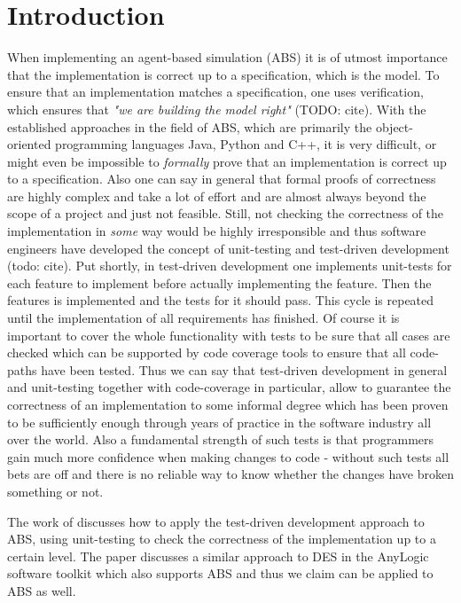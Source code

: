 \section{Introduction}
When implementing an agent-based simulation (ABS) it is of utmost importance that the implementation is correct up to a specification, which is the model. To ensure that an implementation matches a specification, one uses verification, which ensures that \textit{"we are building the model right"} (TODO: cite). With the established approaches in the field of ABS, which are primarily the object-oriented programming languages Java, Python and C++, it is very difficult, or might even be impossible to \textit{formally} prove that an implementation is correct up to a specification. Also one can say in general that formal proofs of correctness are highly complex and take a lot of effort and are almost always beyond the scope of a project and just not feasible. Still, not checking the correctness of the implementation in \textit{some} way would be highly irresponsible and thus software engineers have developed the concept of unit-testing and test-driven development (todo: cite). Put shortly, in test-driven development one implements unit-tests for each feature to implement before actually implementing the feature. Then the features is implemented and the tests for it should pass. This cycle is repeated until the implementation of all requirements has finished. Of course it is important to cover the whole functionality with tests to be sure that all cases are checked which can be supported by code coverage tools to ensure that all code-paths have been tested.
Thus we can say that test-driven development in general and unit-testing together with code-coverage in particular, allow to guarantee the correctness of an implementation to some informal degree which has been proven to be sufficiently enough through years of practice in the software industry all over the world. Also a fundamental strength of such tests is that programmers gain much more confidence when making changes to code - without such tests all bets are off and there is no reliable way to know whether the changes have broken something or not.

The work of \cite{collier_test-driven_2013} discusses how to apply the test-driven development approach to ABS, using unit-testing to check the correctness of the implementation up to a certain level. The paper \cite{asta_investigation_2014} discusses a similar approach to DES in the AnyLogic software toolkit which also supports ABS and thus we claim can be applied to ABS as well. %

